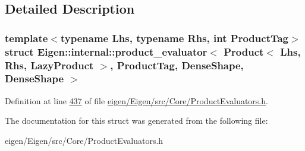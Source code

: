 \subsection{Detailed Description}
\subsubsection*{template$<$typename Lhs, typename Rhs, int Product\+Tag$>$\newline
struct Eigen\+::internal\+::product\+\_\+evaluator$<$ Product$<$ Lhs, Rhs, Lazy\+Product $>$, Product\+Tag, Dense\+Shape, Dense\+Shape $>$}



Definition at line \hyperlink{eigen_2_eigen_2src_2_core_2_product_evaluators_8h_source_l00437}{437} of file \hyperlink{eigen_2_eigen_2src_2_core_2_product_evaluators_8h_source}{eigen/\+Eigen/src/\+Core/\+Product\+Evaluators.\+h}.



The documentation for this struct was generated from the following file\+:\begin{DoxyCompactItemize}
\item 
eigen/\+Eigen/src/\+Core/\+Product\+Evaluators.\+h\end{DoxyCompactItemize}
